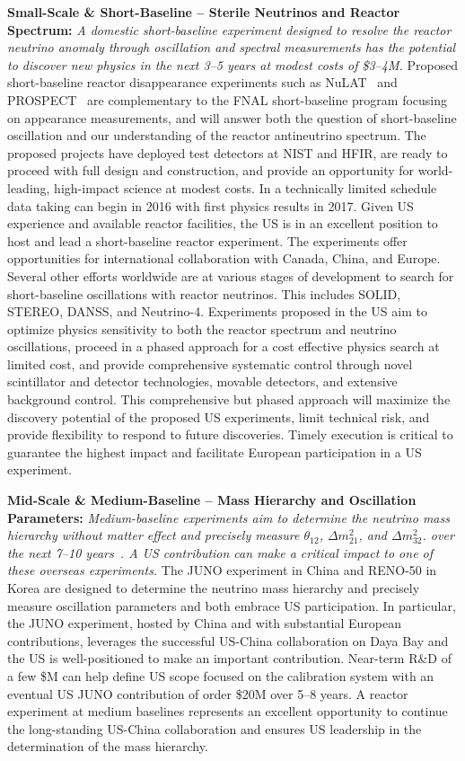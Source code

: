 {\bf Small-Scale \& Short-Baseline -- Sterile Neutrinos and Reactor Spectrum:}
{\em A domestic short-baseline experiment designed to resolve the
reactor neutrino anomaly through oscillation and spectral measurements
has the potential to discover new physics in the next 3--5 years at
modest costs of \$3--4M.}  Proposed short-baseline reactor
disappearance experiments such as NuLAT~\cite{Lane:2015alq} and
PROSPECT~\cite{Ashenfelter:2013oaa} are complementary to the FNAL
short-baseline program focusing on appearance measurements, and will
answer both the question of short-baseline oscillation and our
understanding of the reactor antineutrino spectrum. The proposed
projects have deployed test detectors at NIST and HFIR, are ready to
proceed with full design and construction, and provide an opportunity
for world-leading, high-impact science at modest costs. In a
technically limited schedule data taking can begin in 2016 with first
physics results in 2017. Given US experience and available reactor
facilities, the US is in an excellent position to host and lead a
short-baseline reactor experiment. The experiments offer opportunities
for international collaboration with Canada, China, and Europe.
Several other efforts worldwide are at various stages of development
to search for short-baseline oscillations with reactor neutrinos. This
includes SOLID, STEREO, DANSS, and Neutrino-4. Experiments proposed in
the US aim to optimize physics sensitivity to both the reactor
spectrum and neutrino oscillations, proceed in a phased approach for a
cost effective physics search at limited cost, and provide
comprehensive systematic control through novel scintillator and
detector technologies, movable detectors, and extensive background
control. This comprehensive but phased approach will maximize the
discovery potential of the proposed US experiments, limit technical
risk, and provide flexibility to respond to future discoveries.
Timely execution is critical to guarantee the highest impact and
facilitate European participation in a US experiment.

{\bf Mid-Scale \& Medium-Baseline -- Mass Hierarchy and Oscillation
 Parameters:} {\em Medium-baseline experiments aim to determine the
 neutrino mass hierarchy without matter effect and precisely measure
 $\theta_{12}$, $\Delta m^2_{21}$, and $\Delta m^2_{32}$. over the
 next 7--10 years~\cite{Kettell:2013eos}. A US contribution can make a
 critical impact to one of these overseas experiments.} The JUNO
 experiment in China and RENO-50 in Korea are designed to determine
 the neutrino mass hierarchy and precisely measure oscillation
 parameters and both embrace US participation. In particular, the JUNO
 experiment, hosted by China and with substantial European
 contributions, leverages the successful US-China collaboration on
 Daya Bay and the US is well-positioned to make an important
 contribution.  Near-term R\&D of a few \$M can help define US scope
 focused on the calibration system with an eventual US JUNO
 contribution of order \$20M over 5--8 years.  A reactor experiment at
 medium baselines represents an excellent opportunity to continue the
 long-standing US-China collaboration and ensures US leadership in the
 determination of the mass hierarchy.

